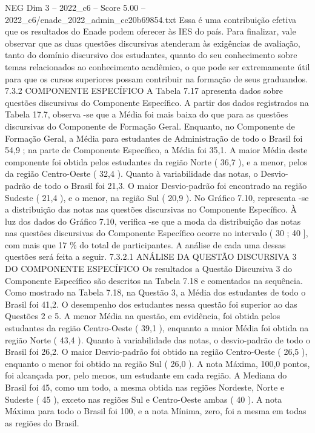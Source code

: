 \begin{textsample}{NEG Dim 3 – 2022\_c6 – Score 5.00 – 2022\_c6/enade\_2022\_admin\_cc20b69854.txt}
Essa é uma contribuição efetiva que os resultados do Enade podem oferecer às IES do país.
Para finalizar, vale observar que as duas questões discursivas atenderam às exigências de avaliação, tanto do domínio discursivo dos estudantes, quanto do seu conhecimento sobre temas relacionados ao conhecimento acadêmico, o que pode ser extremamente útil para que os cursos superiores possam contribuir na formação de seus graduandos. 7.3.2 COMPONENTE ESPECÍFICO A Tabela 7.17 apresenta dados sobre questões discursivas do Componente Específico.
A partir dos dados registrados na Tabela 17.7, observa -se que a Média foi mais baixa do que para as questões discursivas do Componente de Formação Geral.
Enquanto, no Componente de Formação Geral, a Média para estudantes de Administração de todo o Brasil foi 54,9 ; na parte de Componente Específico, a Média foi 35,1.
A maior Média deste componente foi obtida pelos estudantes da região Norte ( 36,7 ), e a menor, pelos da região Centro-Oeste ( 32,4 ).
Quanto à variabilidade das notas, o Desvio-padrão de todo o Brasil foi 21,3.
O maior Desvio-padrão foi encontrado na região Sudeste ( 21,4 ), e o menor, na região Sul ( 20,9 ).
No Gráfico 7.10, representa -se a distribuição das notas nas questões discursivas no Componente Específico.
À luz dos dados do Gráfico 7.10, verifica -se que a moda da distribuição das notas nas questões discursivas do Componente Específico ocorre no intervalo ( 30 ; 40 ], com mais que 17 \% do total de participantes.
A análise de cada uma dessas questões será feita a seguir. 7.3.2.1 ANÁLISE DA QUESTÃO DISCURSIVA 3 DO COMPONENTE ESPECÍFICO Os resultados a Questão Discursiva 3 do Componente Específico são descritos na Tabela 7.18 e comentados na sequência.
Como mostrado na Tabela 7.18, na Questão 3, a Média dos estudantes de todo o Brasil foi 41,2.
O desempenho dos estudantes nessa questão foi superior ao das Questões 2 e 5.
A menor Média na questão, em evidência, foi obtida pelos estudantes da região Centro-Oeste ( 39,1 ), enquanto a maior Média foi obtida na região Norte ( 43,4 ).
Quanto à variabilidade das notas, o desvio-padrão de todo o Brasil foi 26,2.
O maior Desvio-padrão foi obtido na região Centro-Oeste ( 26,5 ), enquanto o menor foi obtido na região Sul ( 26,0 ).
A nota Máxima, 100,0 pontos, foi alcançada por, pelo menos, um estudante em cada região.
A Mediana do Brasil foi 45, como um todo, a mesma obtida nas regiões Nordeste, Norte e Sudeste ( 45 ), exceto nas regiões Sul e Centro-Oeste ambas ( 40 ).
A nota Máxima para todo o Brasil foi 100, e a nota Mínima, zero, foi a mesma em todas as regiões do Brasil.

\end{textsample}
